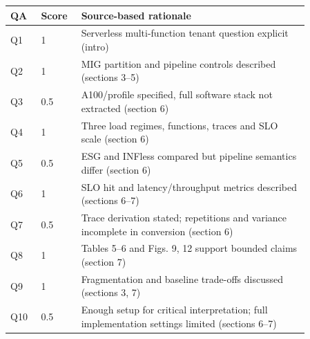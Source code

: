 \begin{longtable}{P{0.09\linewidth}P{0.10\linewidth}P{0.67\linewidth}}
\toprule QA & Score & Source-based rationale\\\midrule\endhead
Q1 & 1 & Serverless multi-function tenant question explicit (intro)\\
Q2 & 1 & MIG partition and pipeline controls described (sections 3–5)\\
Q3 & 0.5 & A100/profile specified, full software stack not extracted (section 6)\\
Q4 & 1 & Three load regimes, functions, traces and SLO scale (section 6)\\
Q5 & 0.5 & ESG and INFless compared but pipeline semantics differ (section 6)\\
Q6 & 1 & SLO hit and latency/throughput metrics described (sections 6–7)\\
Q7 & 0.5 & Trace derivation stated; repetitions and variance incomplete in conversion (section 6)\\
Q8 & 1 & Tables 5–6 and Figs. 9, 12 support bounded claims (section 7)\\
Q9 & 1 & Fragmentation and baseline trade-offs discussed (sections 3, 7)\\
Q10 & 0.5 & Enough setup for critical interpretation; full implementation settings limited (sections 6–7)\\
\bottomrule\end{longtable}


